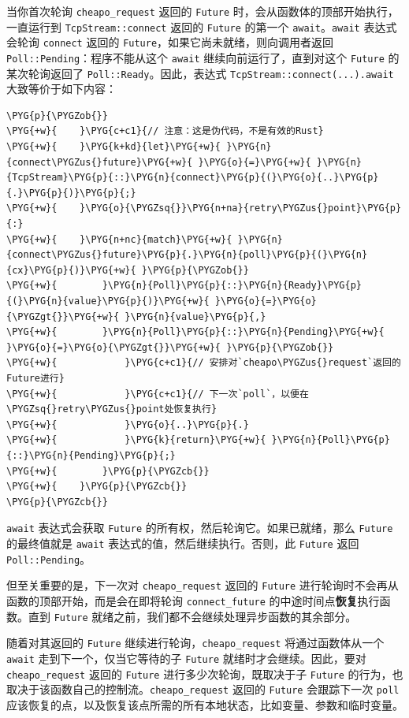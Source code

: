 当你首次轮询 \texttt{cheapo\_request} 返回的 \texttt{Future} 时，会从函数体的顶部开始执行，一直运行到 \texttt{TcpStream::connect} 返回的 \texttt{Future} 的第一个 \texttt{await}。\texttt{await} 表达式会轮询 \texttt{connect} 返回的 \texttt{Future}，如果它尚未就绪，则向调用者返回 \texttt{Poll::Pending}：程序不能从这个 \texttt{await} 继续向前运行了，直到对这个 \texttt{Future} 的某次轮询返回了 \texttt{Poll::Ready}。因此，表达式 \texttt{TcpStream::connect(...).await} 大致等价于如下内容：

\begin{Verbatim}[commandchars=\\\{\},breaklines=true,breakanywhere=true,fontsize=\codefont,xleftmargin=17bp]
\PYG{p}{\PYGZob{}}
\PYG{+w}{    }\PYG{c+c1}{// 注意：这是伪代码，不是有效的Rust}
\PYG{+w}{    }\PYG{k+kd}{let}\PYG{+w}{ }\PYG{n}{connect\PYGZus{}future}\PYG{+w}{ }\PYG{o}{=}\PYG{+w}{ }\PYG{n}{TcpStream}\PYG{p}{::}\PYG{n}{connect}\PYG{p}{(}\PYG{o}{..}\PYG{p}{.}\PYG{p}{)}\PYG{p}{;}
\PYG{+w}{    }\PYG{o}{\PYGZsq{}}\PYG{n+na}{retry\PYGZus{}point}\PYG{p}{:}
\PYG{+w}{    }\PYG{n+nc}{match}\PYG{+w}{ }\PYG{n}{connect\PYGZus{}future}\PYG{p}{.}\PYG{n}{poll}\PYG{p}{(}\PYG{n}{cx}\PYG{p}{)}\PYG{+w}{ }\PYG{p}{\PYGZob{}}
\PYG{+w}{        }\PYG{n}{Poll}\PYG{p}{::}\PYG{n}{Ready}\PYG{p}{(}\PYG{n}{value}\PYG{p}{)}\PYG{+w}{ }\PYG{o}{=}\PYG{o}{\PYGZgt{}}\PYG{+w}{ }\PYG{n}{value}\PYG{p}{,}
\PYG{+w}{        }\PYG{n}{Poll}\PYG{p}{::}\PYG{n}{Pending}\PYG{+w}{ }\PYG{o}{=}\PYG{o}{\PYGZgt{}}\PYG{+w}{ }\PYG{p}{\PYGZob{}}
\PYG{+w}{            }\PYG{c+c1}{// 安排对`cheapo\PYGZus{}request`返回的Future进行}
\PYG{+w}{            }\PYG{c+c1}{// 下一次`poll`，以便在\PYGZsq{}retry\PYGZus{}point处恢复执行}
\PYG{+w}{            }\PYG{o}{..}\PYG{p}{.}
\PYG{+w}{            }\PYG{k}{return}\PYG{+w}{ }\PYG{n}{Poll}\PYG{p}{::}\PYG{n}{Pending}\PYG{p}{;}
\PYG{+w}{        }\PYG{p}{\PYGZcb{}}
\PYG{+w}{    }\PYG{p}{\PYGZcb{}}
\PYG{p}{\PYGZcb{}}
\end{Verbatim}

\texttt{await} 表达式会获取 \texttt{Future} 的所有权，然后轮询它。如果已就绪，那么 \texttt{Future} 的最终值就是 \texttt{await} 表达式的值，然后继续执行。否则，此 \texttt{Future} 返回 \texttt{Poll::Pending}。

但至关重要的是，下一次对 \texttt{cheapo\_request} 返回的 \texttt{Future} 进行轮询时不会再从函数的顶部开始，而是会在即将轮询 \texttt{connect\_future} 的中途时间点\textbf{恢复}执行函数。直到 \texttt{Future} 就绪之前，我们都不会继续处理异步函数的其余部分。

随着对其返回的 \texttt{Future} 继续进行轮询，\texttt{cheapo\_request} 将通过函数体从一个 \texttt{await} 走到下一个，仅当它等待的子 \texttt{Future} 就绪时才会继续。因此，要对 \texttt{cheapo\_request} 返回的 \texttt{Future} 进行多少次轮询，既取决于子 \texttt{Future} 的行为，也取决于该函数自己的控制流。\texttt{cheapo\_request} 返回的 \texttt{Future} 会跟踪下一次 \texttt{poll} 应该恢复的点，以及恢复该点所需的所有本地状态，比如变量、参数和临时变量。

